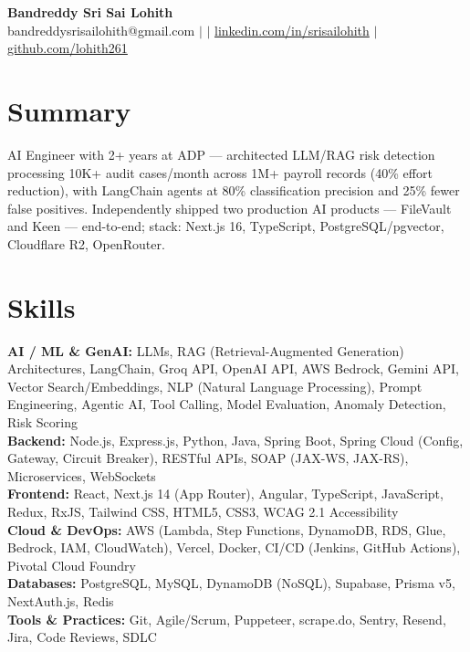 \documentclass[10pt,letterpaper]{article}
\newcommand{\skillrow}[2]{\textbf{#1:} #2 \\[1pt]}
\begin{document}
\begin{center}
  {\Huge\bfseries Bandreddy Sri Sai Lohith}\\[3pt]
  \small bandreddysrisailohith@gmail.com $\vert$ $\vert$\; \href{https://linkedin.com/in/srisailohith}{linkedin.com/in/srisailohith} $\vert$\; \href{https://github.com/lohith261}{github.com/lohith261}
\end{center}

\section{Summary}

AI Engineer with 2+ years at ADP --- architected LLM/RAG risk detection processing 10K+ audit cases/month across 1M+ payroll records (40\% effort reduction), with LangChain agents at 80\% classification precision and 25\% fewer false positives.
      Independently shipped two production AI products --- FileVault and Keen --- end-to-end; stack: Next.js 16, TypeScript, PostgreSQL/pgvector, Cloudflare R2, OpenRouter.

\section{Skills}

\skillrow{AI / ML \& GenAI}{LLMs, RAG (Retrieval-Augmented Generation) Architectures, LangChain, Groq API, OpenAI API, AWS Bedrock, Gemini API, Vector Search/Embeddings, NLP (Natural Language Processing), Prompt Engineering, Agentic AI, Tool Calling, Model Evaluation, Anomaly Detection, Risk Scoring}
\skillrow{Backend}{Node.js, Express.js, Python, Java, Spring Boot, Spring Cloud (Config, Gateway, Circuit Breaker), RESTful APIs, SOAP (JAX-WS, JAX-RS), Microservices, WebSockets}
\skillrow{Frontend}{React, Next.js 14 (App Router), Angular, TypeScript, JavaScript, Redux, RxJS, Tailwind CSS, HTML5, CSS3, WCAG 2.1 Accessibility}
\skillrow{Cloud \& DevOps}{AWS (Lambda, Step Functions, DynamoDB, RDS, Glue, Bedrock, IAM, CloudWatch), Vercel, Docker, CI/CD (Jenkins, GitHub Actions), Pivotal Cloud Foundry}
\skillrow{Databases}{PostgreSQL, MySQL, DynamoDB (NoSQL), Supabase, Prisma v5, NextAuth.js, Redis}
\skillrow{Tools \& Practices}{Git, Agile/Scrum, Puppeteer, scrape.do, Sentry, Resend, Jira, Code Reviews, SDLC}
\end{document}
